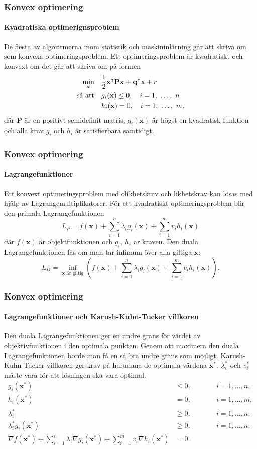 \documentclass{beamer}
\theoremstyle{definition}
\theoremstyle{remark}
\newcommand{\bfx}{\mathbf{x}}
\begin{document}
\begin{frame}
	\frametitle{Konvex optimering}
	\framesubtitle{Kvadratiska optimerignsproblem}
	De flesta av algoritmerna inom statistik och maskininlärning går att skriva om som konvexa optimeringsproblem.
	Ett optimeringsproblem är kvadratiskt och konvext om det går att skriva om på formen
	\begin{equation*}
	\begin{aligned}
	\operatornamewithlimits{min}_\bfx& & &\frac{1}{2}\bfx^\intercal\mathbf{P}\bfx+\mathbf{q}^\intercal\bfx + r\\
	\text{så att}& & &g_i(\bfx)\leq0,\quad i=1,~\dots,~n\\
	& & &h_i(\bfx)=0,\quad i=1,~\dots,~m,\\
	\end{aligned}
	\end{equation*}
	där $\mathbf{P}$ är en positivt semidefinit matris, $g_i(\bfx)$ är högst en kvadratisk funktion och alla krav $g_i$ och $h_i$ är satisfierbara samtidigt.
\end{frame}

\begin{frame}
	\frametitle{Konvex optimering}
	\framesubtitle{Lagrangefunktioner}
	Ett konvext optimeringsproblem med olikhetskrav och likhetskrav kan lösas  med hjälp av Lagrangemultiplikatorer.
	För ett kvadratiskt optimeringsproblem blir den primala Lagrangefunktionen
	\begin{equation*}
		L_P=f(\bfx) + \sum_{i=1}^{n}\lambda_ig_i(\bfx)+\sum_{i=1}^{m}v_ih_i(\bfx)
	\end{equation*}
	där $f(\bfx)$ är objektfunktionen och $g_i,~h_i$ är kraven.
	Den duala Lagrangefunktionen fås om man tar infimum över alla giltiga $\bfx$:
	\begin{equation*}
		L_D=\inf_{\bfx\text{ är giltig}}\left(f(\bfx) + \sum_{i=1}^{n}\lambda_ig_i(\bfx)+\sum_{i=1}^{m}v_ih_i(\bfx)\right).
	\end{equation*}
\end{frame}

\begin{frame}
\frametitle{Konvex optimering}
\framesubtitle{Lagrangefunktioner och Karush-Kuhn-Tucker villkoren}
	Den duala Lagrangefunktionen ger en undre gräns för värdet av objektivfunktionen i den optimala punkten.
	Genom att maximera den duala Lagrangefunktionen borde man få en så bra undre gräns som möjligt.
	Karush-Kuhn-Tucker villkoren ger krav på hurudana de optimala värdena $\bfx^*,~\lambda_i^*$ och $v_i^*$ måste vara för att lösningen ska vara optimal.
	\begin{align*}
		g_i(\bfx^*)&\leq0,\qquad& &i=1, \dots, n,\\
		h_i(\bfx^*)&=0,\qquad& &i=1, \dots, m,\\
		\lambda_i^*&\geq 0 ,\qquad& &i=1, \dots, n,\\
		\lambda_i^*g_i(\bfx^*)&\geq 0 ,\qquad& &i=1, \dots, n,\\
		\nabla f(\bfx^*) + \sum_{i=1}^{n}\lambda_i\nabla g_i(\bfx^*)+\sum_{i=1}^{m}v_i\nabla h_i(\bfx^*)&=0.
	\end{align*}
\end{frame}
\end{document}

